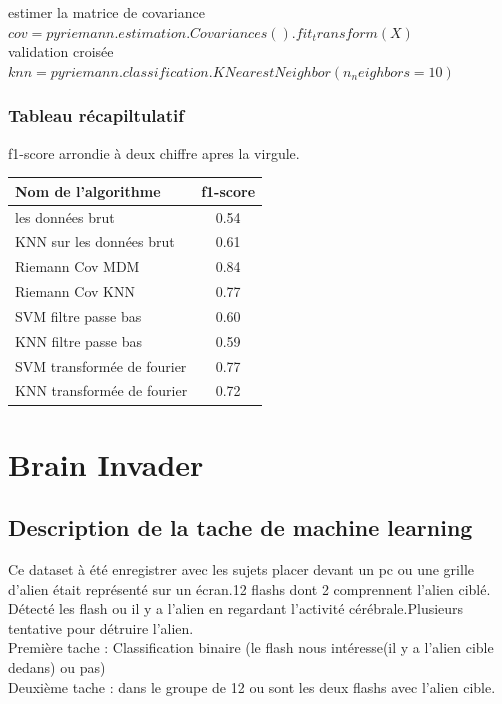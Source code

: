 \documentclass{article}
\begin{document}
estimer la matrice de covariance\\
$
cov = pyriemann.estimation.Covariances().fit_transform(X)
$
\\
validation croisée\\
$
knn = pyriemann.classification.KNearestNeighbor(n_neighbors=10)
$

\subsubsection{Tableau récapiltulatif}
f1-score arrondie à deux chiffre apres la virgule.\\
\begin{tabular}{|l|c|}
  \hline
  Nom de l'algorithme & f1-score\\
  \hline
  les données brut & 0.54 \\
  KNN sur les données brut & 0.61\\
  Riemann Cov MDM  & 0.84 \\
  Riemann Cov KNN & 0.77\\
  SVM filtre passe bas & 0.60 \\
  KNN filtre passe bas & 0.59 \\
  SVM transformée de fourier & 0.77 \\
  KNN transformée de fourier & 0.72 \\
  \hline
\end{tabular}

\section{Brain Invader}
\subsection{Description de la tache de machine learning}
Ce dataset à été enregistrer avec les sujets placer devant un pc ou une grille d'alien était représenté sur un écran.12 flashs dont 2 comprennent l'alien ciblé. Détecté les flash ou il y a l'alien en regardant l'activité cérébrale.Plusieurs tentative pour détruire l'alien.\\
Première tache : Classification binaire (le flash nous intéresse(il y a l'alien cible dedans) ou pas)\\
Deuxième tache : dans le groupe de 12 ou sont les deux flashs avec l'alien cible.\\
\end{document}
